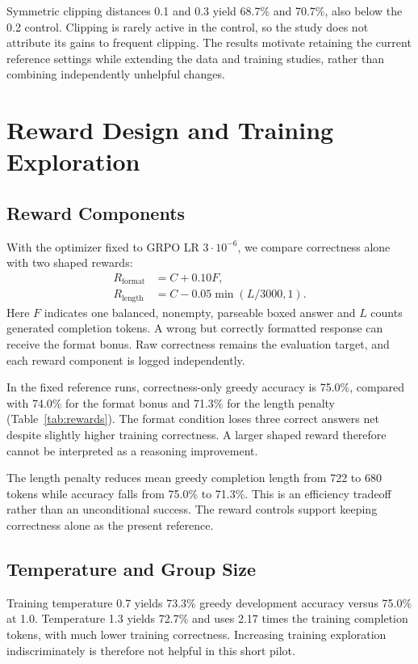 \documentclass[conference]{IEEEtran}
\begin{document}
Symmetric clipping distances 0.1 and 0.3 yield 68.7\% and 70.7\%, also below the 0.2 control. Clipping is rarely active in the control, so the study does not attribute its gains to frequent clipping. The results motivate retaining the current reference settings while extending the data and training studies, rather than combining independently unhelpful changes.

\section{Reward Design and Training Exploration}


\subsection{Reward Components}
With the optimizer fixed to GRPO LR $3\cdot 10^{-6}$, we compare correctness alone with two shaped rewards:
\begin{align}
R_{\mathrm{format}}&=C+0.10F,\\
R_{\mathrm{length}}&=C-0.05\min(L/3000,1).
\end{align}
Here $F$ indicates one balanced, nonempty, parseable boxed answer and $L$ counts generated completion tokens. A wrong but correctly formatted response can receive the format bonus. Raw correctness remains the evaluation target, and each reward component is logged independently.

In the fixed reference runs, correctness-only greedy accuracy is 75.0\%, compared with 74.0\% for the format bonus and 71.3\% for the length penalty (Table~\ref{tab:rewards}). The format condition loses three correct answers net despite slightly higher training correctness. A larger shaped reward therefore cannot be interpreted as a reasoning improvement.

The length penalty reduces mean greedy completion length from 722 to 680 tokens while accuracy falls from 75.0\% to 71.3\%. This is an efficiency tradeoff rather than an unconditional success. The reward controls support keeping correctness alone as the present reference.

\subsection{Temperature and Group Size}
Training temperature 0.7 yields 73.3\% greedy development accuracy versus 75.0\% at 1.0. Temperature 1.3 yields 72.7\% and uses 2.17 times the training completion tokens, with much lower training correctness. Increasing training exploration indiscriminately is therefore not helpful in this short pilot.
\end{document}
